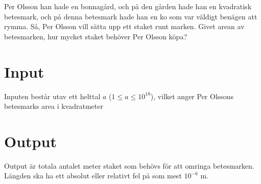 
%
Per Olsson han hade en bonnagård, och på den gården hade han en kvadratisk
betesmark, och på denna betesmark hade han en ko som var väldigt benägen
att rymma. Så, Per Olsson vill sätta upp ett staket runt marken.
Givet arean av betesmarken, hur mycket staket behöver Per Olsson
köpa?

\section*{Input}

Inputen består utav ett helttal $a$ ($1 \le a \le 10^{18}$), vilket anger Per Olssons
betesmarks area i kvadratmeter

\section*{Output}

Output är totala antalet meter staket som behövs för att omringa betesmarken.
Längden ska ha ett absolut eller relativt fel på som mest $10^{-6}$ m.
